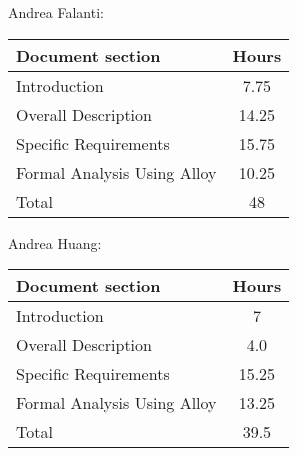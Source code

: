 Andrea Falanti:

\begin{tabular}{|l|c|}
    \hline
    Document section & Hours \\
    \hline
     Introduction & 7.75\\
     Overall Description & 14.25\\
     Specific Requirements & 15.75\\
     Formal Analysis Using Alloy & 10.25\\
     \hline
     Total & 48\\
     \hline
\end{tabular}
\vskip 0.3in

Andrea Huang:

\begin{tabular}{|l|c|}
    \hline
    Document section & Hours \\
    \hline
     Introduction &  7\\
     Overall Description & 4.0\\
     Specific Requirements & 15.25\\
     Formal Analysis Using Alloy & 13.25\\
     \hline
     Total & 39.5\\
     \hline
\end{tabular}